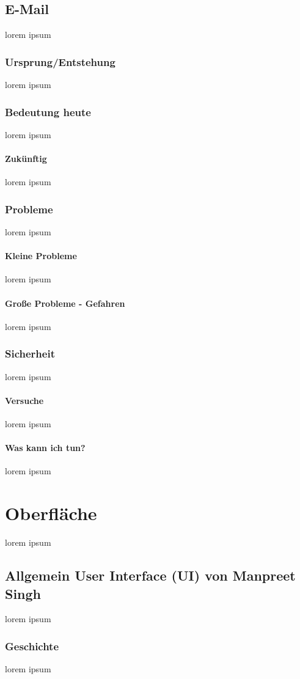 \documentclass[12pt,a4paper]{report}
\begin{document}
\section{E-Mail}
lorem ipsum
\subsection{Ursprung/Entstehung}
lorem ipsum
\subsection{Bedeutung heute}
lorem ipsum
\subsubsection{Zukünftig}
lorem ipsum
\subsection{Probleme}
lorem ipsum
\subsubsection{Kleine Probleme}
lorem ipsum
\subsubsection{Große Probleme - Gefahren}
lorem ipsum
\subsection{Sicherheit}
lorem ipsum
\subsubsection{Versuche}
lorem ipsum
\subsubsection{Was kann ich tun?}
lorem ipsum

\chapter{Oberfläche}
lorem ipsum
\section{Allgemein User Interface (UI) von Manpreet Singh}
lorem ipsum
\subsection{Geschichte}
lorem ipsum
\end{document}
